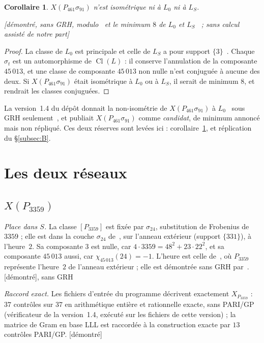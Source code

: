 \documentclass[11pt,a4paper]{amsart}
\theoremstyle{plain}
\newtheorem{corollary}[theorem]{Corollaire}
\theoremstyle{definition}
\DeclareMathOperator{\Cl}{Cl}
\newcommand{\Lz}{L_{0}}
\newcommand{\LS}{L_{S}}
\newcommand{\XA}{X(P_{3359})}
\newcommand{\XB}{X(P_{461}\sigma_{91})}
\newcommand{\st}[1]{\textup{\textsf{\small[#1]}}}
\newcommand{\DEM}{\st{démontré}}
\begin{document}
\begin{corollary}\label{cor:L0}
$\XB$ n'est isométrique ni à $\Lz$ ni à $\LS$.

\st{démontré, sans GRH, modulo~\cite[th.~3.3]{Gau26} et le minimum $8$ de $\Lz$ et $\LS$~\cite{Sak26} ; sans calcul assisté de notre part}
\end{corollary}

\begin{proof}
La classe de $\Lz$ est principale et celle de $\LS$ a pour support $\{3\}$~\cite[prop.~2.7]{Gau26}. Chaque $\sigma_t$ est un automorphisme de $\Cl(L)$ : il conserve l'annulation de la composante $45\,013$, et une classe de composante $45\,013$ non nulle n'est conjuguée à aucune des deux. Si $\XB$ était isométrique à $\Lz$ ou à $\LS$, il serait de minimum $8$, et~\cite[th.~3.3]{Gau26} rendrait les classes conjuguées.
\end{proof}

La version~1.4 du dépôt donnait la non-isométrie de $\XB$ à $\Lz$ \guillemotleft~sous GRH seulement~\guillemotright, et publiait $\XB$ comme \emph{candidat}, de minimum annoncé mais non répliqué. Ces deux réserves sont levées ici : corollaire~\ref{cor:L0}, et réplication du \S\ref{subsec:B}.

\section{Les deux réseaux}\label{sec:reseaux}

\subsection{\texorpdfstring{$\XA$}{X(P3359)}}\label{subsec:A}
\emph{Place dans $S$.} La classe $[P_{3359}]$ est fixée par $\sigma_{24}$, substitution de Frobenius de $3359$ ; elle est dans la couche $\sigma_{24}$ de~\cite[\S4]{Gau26a}, sur l'anneau extérieur (support $\{331\}$), à l'heure~$2$. Sa composante $3$ est nulle, car $4\cdot3359=48^2+23\cdot22^2$, et sa composante $45\,013$ aussi, car $\chi_{45\,013}(24)=-1$. L'heure est celle de~\cite[tableau~3]{Gau26a}, où $P_{3359}$ représente l'heure~$2$ de l'anneau extérieur ; elle est démontrée sans GRH par~\cite[prop.~4.7, cor.~4.8]{Gau26a}. \DEM, sans GRH

\emph{Raccord exact.} Les fichiers d'entrée du programme décrivent exactement $X_{P_{3359}}$ : $37$ contrôles sur $37$ en arithmétique entière et rationnelle exacte, sans PARI/GP (vérificateur de la version~1.4, exécuté sur les fichiers de cette version) ; la matrice de Gram en base LLL est raccordée à la construction exacte par $13$ contrôles PARI/GP. \DEM
\end{document}
